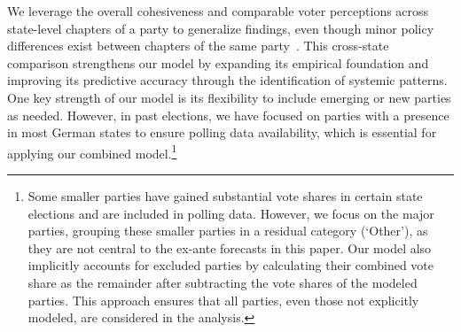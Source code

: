 \documentclass[doublespaced,12pt]{article}
\begin{document}
\begin{doublespacing}
We leverage the overall cohesiveness and comparable voter perceptions across state-level chapters of a party to generalize findings, even though minor policy differences exist between chapters of the same party~\citep{Brauninger2020}. This cross-state comparison strengthens our model by expanding its empirical foundation and improving its predictive accuracy through the identification of systemic patterns. One key strength of our model is its flexibility to include emerging or new parties as needed. However, in past elections, we have focused on parties with a presence in most German states to ensure polling data availability, which is essential for applying our combined model.\footnote{Some smaller parties have gained substantial vote shares in certain state elections and are included in polling data. However, we focus on the major parties, grouping these smaller parties in a residual category (`Other'), as they are not central to the ex-ante forecasts in this paper. Our model also implicitly accounts for excluded parties by calculating their combined vote share as the remainder after subtracting the vote shares of the modeled parties. This approach ensures that all parties, even those not explicitly modeled, are considered in the analysis.}









\end{doublespacing}
\end{document}
